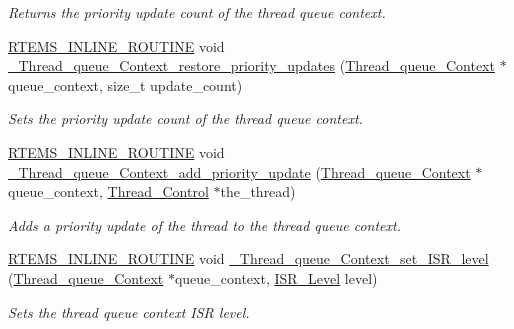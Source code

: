 \begin{DoxyCompactItemize}
\begin{DoxyCompactList}\small\item\em Returns the priority update count of the thread queue context. \end{DoxyCompactList}\item 
\mbox{\hyperlink{group__RTEMSScoreBaseDefs_gac216239df231d5dbd15e3520b0b9313f}{R\+T\+E\+M\+S\+\_\+\+I\+N\+L\+I\+N\+E\+\_\+\+R\+O\+U\+T\+I\+NE}} void \mbox{\hyperlink{group__RTEMSScoreThreadQueue_ga0adb6adf8dfbbf4836b243b805cdcf51}{\+\_\+\+Thread\+\_\+queue\+\_\+\+Context\+\_\+restore\+\_\+priority\+\_\+updates}} (\mbox{\hyperlink{structThread__queue__Context}{Thread\+\_\+queue\+\_\+\+Context}} $\ast$queue\+\_\+context, size\+\_\+t update\+\_\+count)
\begin{DoxyCompactList}\small\item\em Sets the priority update count of the thread queue context. \end{DoxyCompactList}\item 
\mbox{\hyperlink{group__RTEMSScoreBaseDefs_gac216239df231d5dbd15e3520b0b9313f}{R\+T\+E\+M\+S\+\_\+\+I\+N\+L\+I\+N\+E\+\_\+\+R\+O\+U\+T\+I\+NE}} void \mbox{\hyperlink{group__RTEMSScoreThreadQueue_ga5a5f1fcac92cc64364be93f2f5c131f6}{\+\_\+\+Thread\+\_\+queue\+\_\+\+Context\+\_\+add\+\_\+priority\+\_\+update}} (\mbox{\hyperlink{structThread__queue__Context}{Thread\+\_\+queue\+\_\+\+Context}} $\ast$queue\+\_\+context, \mbox{\hyperlink{struct__Thread__Control}{Thread\+\_\+\+Control}} $\ast$the\+\_\+thread)
\begin{DoxyCompactList}\small\item\em Adds a priority update of the thread to the thread queue context. \end{DoxyCompactList}\item 
\mbox{\hyperlink{group__RTEMSScoreBaseDefs_gac216239df231d5dbd15e3520b0b9313f}{R\+T\+E\+M\+S\+\_\+\+I\+N\+L\+I\+N\+E\+\_\+\+R\+O\+U\+T\+I\+NE}} void \mbox{\hyperlink{group__RTEMSScoreThreadQueue_ga076b043e2ddbb7500429a733cac31f1f}{\+\_\+\+Thread\+\_\+queue\+\_\+\+Context\+\_\+set\+\_\+\+I\+S\+R\+\_\+level}} (\mbox{\hyperlink{structThread__queue__Context}{Thread\+\_\+queue\+\_\+\+Context}} $\ast$queue\+\_\+context, \mbox{\hyperlink{group__RTEMSScoreISR_gad1af728587ebcefec5b5cf94fc7909b9}{I\+S\+R\+\_\+\+Level}} level)
\begin{DoxyCompactList}\small\item\em Sets the thread queue context I\+SR level. \end{DoxyCompactList}\item 

\end{DoxyCompactItemize}
